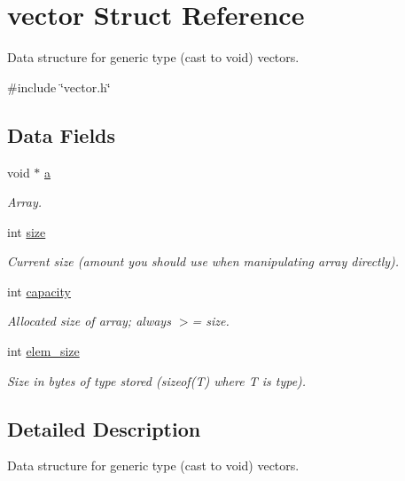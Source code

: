 \hypertarget{structvector}{
\section{vector Struct Reference}
\label{structvector}
}


Data structure for generic type (cast to void) vectors.  




{\ttfamily \#include \char`\"{}vector.h\char`\"{}}

\subsection*{Data Fields}
\begin{DoxyCompactItemize}
\item 
void $\ast$ \hyperlink{structvector_ab7be2d9a85f6fa18178475cf04f04024}{a}
\begin{DoxyCompactList}\small\item\em Array. \item\end{DoxyCompactList}\item 
int \hyperlink{structvector_a211c6f9096b87e1ff8b09ad5ad373e61}{size}
\begin{DoxyCompactList}\small\item\em Current size (amount you should use when manipulating array directly). \item\end{DoxyCompactList}\item 
int \hyperlink{structvector_a95bc684a8044cfc0e509861448908bf2}{capacity}
\begin{DoxyCompactList}\small\item\em Allocated size of array; always $>$= size. \item\end{DoxyCompactList}\item 
int \hyperlink{structvector_a1e2d06aaea690d5420fc153fa9b8c2b8}{elem\_\-size}
\begin{DoxyCompactList}\small\item\em Size in bytes of type stored (sizeof(T) where T is type). \item\end{DoxyCompactList}\end{DoxyCompactItemize}


\subsection{Detailed Description}
Data structure for generic type (cast to void) vectors. 

